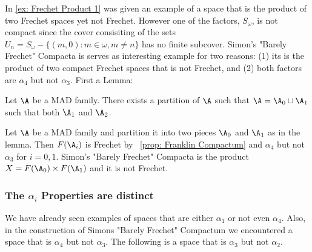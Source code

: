 \documentclass{article}
\begin{document}

In \ref{ex: Frechet Product 1} was given an example of a space that is the product of two Frechet spaces yet not Frechet. However one of the factors, \(S_{\omega}\), is not compact since the cover consisiting of the sets \(U_n = S_{\omega}-\{(m, 0): m \in \omega, m \neq n \}\) has no finite subcover. Simon's "Barely Frechet" Compacta is serves as interesting example for two reasons: (1) its is the product of two compact Frechet spaces that is not Frechet, and (2) both factors are \(\alpha_4\) but not \(\alpha_3\). First a Lemma:

\begin{lem}
    Let \(\A\) be a MAD family. There exists a partition of \(\A\) such that \(\A = \A_0 \sqcup \A_1\) such that both \(\A_1\) and \(\A_2\). 
\end{lem}

\begin{exam}
    Let \(\A\) be a MAD family and partition it into two pieces \(\A_0\) and \(\A_1\) as in the lemma. Then \(F(\A_i)\) is Frechet by ~\ref{prop: Franklin Compactum} and \(\alpha_4\) but not \(\alpha_3\) for \(i = 0, 1\). Simon's "Barely Frechet" Compacta is the product \(X = F(\A_0)\times F(\A_1)\) and it is not Frechet. 
\end{exam}

\subsubsection{The \(\alpha_{i}\) Properties are distinct}

We have already seen examples of spaces that are either \(\alpha_1\) or not even \(\alpha_4\). Also, in the construction of Simons "Barely Frechet" Compactum we encountered a space that is \(\alpha_4\) but not \(\alpha_3\). The following is a space that is \(\alpha_3\) but not \(\alpha_2\). 
\end{document}
